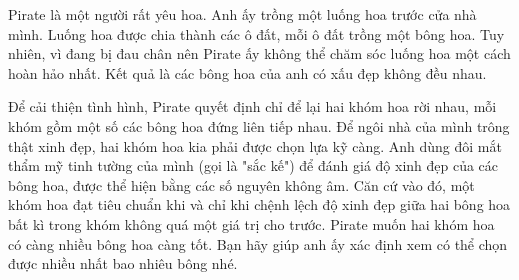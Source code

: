 Pirate là một người rất yêu hoa. Anh ấy trồng một luống hoa trước cửa nhà mình. Luống hoa được chia thành các ô đất, mỗi ô đất trồng một bông hoa. Tuy nhiên, vì đang bị đau chân nên Pirate ấy không thể chăm sóc luống hoa một cách hoàn hảo nhất. Kết quả là các bông hoa của anh có xấu đẹp không đều nhau.  

   Để cải thiện tình hình, Pirate quyết định chỉ để lại hai khóm hoa rời nhau, mỗi khóm gồm một số các bông hoa đứng liên tiếp nhau. Để ngôi nhà của mình trông thật xinh đẹp, hai khóm hoa kia phải được chọn lựa kỹ càng. Anh dùng đôi mắt thẩm mỹ tinh tường của mình (gọi là "sắc kế") để đánh giá độ xinh đẹp của các bông hoa, được thể hiện bằng các số nguyên không âm. Căn cứ vào đó, một khóm hoa đạt tiêu chuẩn khi và chỉ khi chệnh lệch độ xinh đẹp giữa hai bông hoa bất kì trong khóm không quá một giá trị cho trước. Pirate muốn hai khóm hoa có càng nhiều bông hoa càng tốt. Bạn hãy giúp anh ấy xác định xem có thể chọn được nhiều nhất bao nhiêu bông nhé.